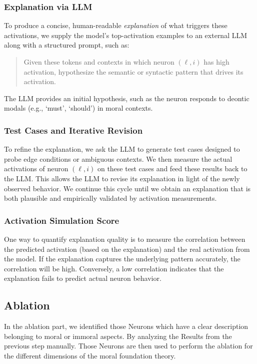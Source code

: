 \documentclass[runninghheads]{llncs}
\begin{document}
\subsubsection{Explanation via LLM}
To produce a concise, human-readable \textit{explanation} of what triggers these activations, we supply the model’s top-activation examples to an external LLM along with a structured prompt, such as:

\begin{quote}
    Given these tokens and contexts in which neuron \((\ell,i)\) has high activation, hypothesize the semantic or syntactic pattern that drives its activation.
\end{quote}

The LLM provides an initial hypothesis, such as the neuron responds to deontic modals (e.g., ‘must’, ‘should’) in moral contexts.  

\subsubsection{Test Cases and Iterative Revision}
To refine the explanation, we ask the LLM to generate test cases designed to probe edge conditions or ambiguous contexts. We then measure the actual activations of neuron \((\ell,i)\) on these test cases and feed these results back to the LLM. This allows the LLM to revise its explanation in light of the newly observed behavior. We continue this cycle until we obtain an explanation that is both plausible and empirically validated by activation measurements.

\subsubsection{Activation Simulation Score} 
One way to quantify explanation quality is to measure the correlation between the predicted activation (based on the explanation) and the real activation from the model. If the explanation captures the underlying pattern accurately, the correlation will be high. Conversely, a low correlation indicates that the explanation fails to predict actual neuron behavior.

\subsection{Ablation}

In the ablation part, we identified those Neurons which have a clear description belonging to moral or immoral aspects. By analyzing the Results from the previous step manually. Those Neurons are then used to perform the ablation for the different dimensions of the moral foundation theory. 
\end{document}
